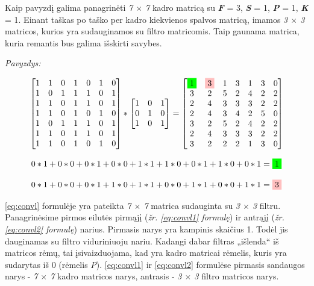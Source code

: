 \documentclass{VUMIFInfKursinis}
\begin{document}
Kaip pavyzdį galima panagrinėti \textit{7 $\times$ 7} kadro matricą su \textbf{\textit{F}} = 3, \textbf{\textit{S}} = 1, \textbf{\textit{P}} = 1, \textbf{\textit{K}} = 1. Einant taškas po taško per kadro kiekvienos spalvos matricą, imamos \textit{3 $\times$ 3} matricos, kurios yra sudauginamos su filtro matricomis. Taip gaunama matrica, kuria remantis bus galima išskirti savybes.

\textit{Pavyzdys:}

\begin{equation}\label{eq:convl}
	\begin{bmatrix}
	1 & 1 & 0 & 1 & 0 & 1 & 0 \\
	1 & 0 & 1 & 1 & 1 & 0 & 1 \\
	1 & 1 & 0 & 1 & 1 & 0 & 1 \\
	1 & 1 & 0 & 1 & 0 & 1 & 0 \\
	1 & 0 & 1 & 1 & 1 & 0 & 1 \\
	1 & 1 & 0 & 1 & 1 & 0 & 1 \\
	1 & 1 & 0 & 1 & 0 & 1 & 0
	\end{bmatrix}
	*
	\begin{bmatrix}
	1 & 0 & 1 \\
	0 & 1 & 0 \\
	1 & 0 & 1
	\end{bmatrix}
	=
	\begin{bmatrix}
	\colorbox{green}{1} & \colorbox{pink}{3} & 1 & 3 & 1 & 3 & 0 \\
	3 & 2 & 5 & 2 & 4 & 2 & 2 \\
	2 & 4 & 3 & 3 & 3 & 2 & 2 \\
	2 & 4 & 3 & 4 & 2 & 5 & 0 \\
	3 & 2 & 5 & 2 & 4 & 2 & 2 \\
	2 & 4 & 3 & 3 & 3 & 2 & 2 \\
	3 & 2 & 2 & 2 & 1 & 3 & 0
	\end{bmatrix}
\end{equation}

\begin{equation}\label{eq:convl1}
	0*1+0*0+0*1+0*0+1*1+1*0+0*1+1*0+0*1=\colorbox{green}{1}
\end{equation}


\begin{equation}\label{eq:convl2}
	0*1+0*0+0*1+1*0+1*1+0*0+1*1+0*0+1*1=\colorbox{pink}{3}
\end{equation}

\ref{eq:convl} formulėje yra pateikta \textit{7 $\times$ 7} matrica sudauginta su \textit{3 $\times$ 3} filtru. Panagrinėsime pirmos eilutės pirmąjį (\textit{žr. \ref{eq:convl1} formulę}) ir antrąjį (\textit{žr. \ref{eq:convl2} formulę}) narius. Pirmasis narys yra kampinis skaičius 1. Todėl jis dauginamas su filtro viduriniuoju nariu. Kadangi dabar filtras „išlenda“ iš matricos rėmų, tai įsivaizduojama, kad yra kadro matricai rėmelis, kuris yra sudarytas iš 0 (rėmelis \textit{P}). \ref{eq:convl1} ir \ref{eq:convl2} formulėse pirmasis sandaugos narys - \textit{7 $\times$ 7} kadro matricos narys, antrasis - \textit{3 $\times$ 3} filtro matricos narys.
\end{document}
